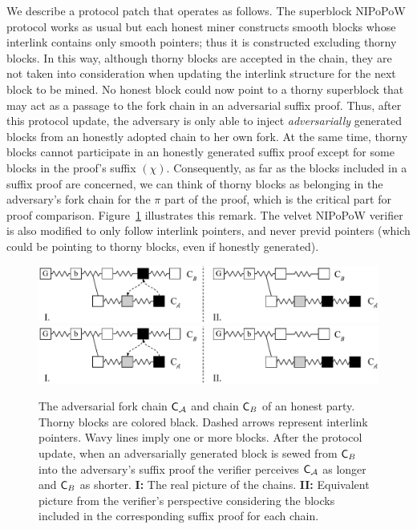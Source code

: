 We describe a protocol patch that operates as follows. The superblock NIPoPoW protocol works as usual but each honest miner constructs smooth blocks whose interlink contains only smooth pointers; thus it is constructed excluding thorny blocks. In this way, although thorny blocks are accepted in the chain, they are not taken into consideration when updating the interlink structure for the next block to be mined. No honest block could now point to a thorny superblock that may act as a passage to the fork chain in an adversarial suffix proof. Thus, after this protocol update, the adversary is only able to inject \emph{adversarially} generated blocks from an honestly adopted chain to her own fork.
At the same time, thorny blocks cannot participate in an honestly generated suffix proof except for some blocks in the proof's suffix $(\chi)$. Consequently, as far as the blocks included in a suffix proof are concerned, we can think of thorny blocks as belonging in the adversary's fork chain for the $\pi$ part of the proof,  which is the critical part for proof comparison.
Figure~\ref{fig:injection} illustrates this remark. The velvet NIPoPoW verifier is also modified to only follow interlink pointers, and never previd pointers (which could be pointing to thorny blocks, even if honestly generated).

\begin{figure}[h!]
	\begin{center}
		\iftwocolumn
			\includegraphics[width=0.8 \textwidth]{figures/injection.pdf}
		\else
			\includegraphics[width=0.8 \textwidth]{figures/injection.pdf}
		\fi
	\end{center}
	\caption{The adversarial fork chain $\mathsf{C}_\mathcal{A}$ and chain $\mathsf{C}_B$ of an honest party. Thorny blocks are colored black. Dashed arrows represent interlink pointers. Wavy lines imply one or more blocks. After the protocol update, when an adversarially generated block is sewed from $\mathsf{C}_B$ into the adversary's suffix proof the verifier perceives $\mathsf{C}_\mathcal{A}$ as longer and $\mathsf{C}_B$ as shorter. \textbf{I:} The real picture of the chains. \textbf{II:} Equivalent picture from the verifier's perspective considering the blocks included in the corresponding suffix proof for each chain.}
	\label{fig:injection}
\end{figure}

